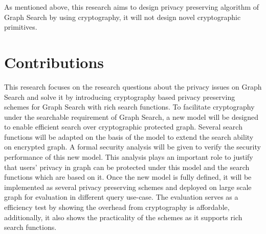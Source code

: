 As mentioned above, this research aims to design privacy preserving algorithm of Graph Search by using cryptography, it will not design novel cryptographic primitives. 

\section{Contributions}
This research focuses on the research questions about the privacy issues on Graph Search and solve it by introducing cryptography based privacy preserving schemes for Graph Search with rich search functions. 
To facilitate cryptography under the searchable requirement of Graph Search, a new model will be designed to enable efficient search over cryptographic protected graph. Several search functions will be adapted on the basis of the model to extend the search ability on encrypted graph. 
A formal security analysis will be given to verify the security performance of this new model. This analysis plays an important role to justify that users' privacy in graph can be protected under this model and the search functions which are based on it. 
Once the new model is fully defined, it will be implemented as several privacy preserving schemes and deployed on large scale graph for evaluation in different query use-case. The evaluation serves as a efficiency test by showing the overhead from cryptography is affordable, additionally, it also shows the practicality of the schemes as it supports rich search functions.






